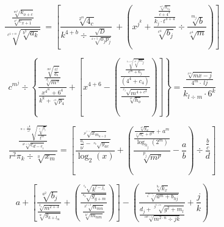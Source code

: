 \documentclass[aspectratio=169]{beamer}
\begin{document}

\begin{frame}
\fontsize{60pt}{60pt}

$$ \frac{\frac{\sqrt[m^4]{k_{o+c}}}{\sqrt[x^c]{c_{x+1}}}}{\sqrt[c^{1+n}]{\sqrt[b^3]{a_k}}}\ = \left[\frac{\sqrt[2^m]{4_c}}{k^{4+b}\div\frac{\sqrt{D}}{\sqrt[4+5]{o_jp_j}}}\ + \left(x^{j^k}+\frac{\frac{\frac{\sqrt[m^n]{h_{c_d}}}{c+4^3}}{k_j \cdot t^{3+4}}}{\sqrt[c^4]{b_j}}\div\frac{\sqrt[m_j]{b}}{\sqrt[c^4]{m}}\right)\right] $$

\end{frame}


\begin{frame}
\fontsize{60pt}{60pt}

$${c^{m^j}}\div{\left\{\frac{\frac{\sqrt[m^4]{\frac{c^j}{d_h}}}{\sqrt[d_j]{m^n}}}{\frac{x^{4^m}+6^4}{k^k+\sqrt[c^4]{p_4}}}+\left[x^{4+6}-\left(\frac{\frac{\frac{\sqrt[4+c]{\sqrt[c^j]{m_j}}}{c^m+6_j}}{\left(4^4+c_4\right)}}{\frac{\sqrt[x_j \ \  \ \ \ ]{m^{4+c^2}}}{\sqrt[c^4]{h_o}}}\right)\right]\right\}}=\frac{\frac{\sqrt[x^m]{mx-j}}{4^m\cdot \:lj}}{k_{l\div m}\cdot 6^k}$$

\end{frame}


\begin{frame}
\fontsize{60pt}{60pt}

$$\frac{\frac{\sqrt[n+\frac{\sqrt[n]{4}}{m^4} \ \  \ \ \ ]{\frac{\sqrt[z]{^{g_j}}}{t^m}}}{\sqrt[a^{b+1}]{c_{d-e_i}}}}{r^2\pi _k\div \sqrt[\pi ]{x_m}}=\left[\frac{\frac{\sqrt[p^{j^{i+1}}]{x_{m_{n\div 2}}}}{\frac{a_i}{b^j}-\sqrt[x_k \ \  \ \ \ ]{y_{ac}}}}{\log _2\left(x\right)}+\left(\frac{\frac{\frac{\sqrt[x^p]{y_w}}{\sqrt[f]{a_c}+b^m}+a^m}{\log _{h_j}\left(2^m\right)}}{\sqrt[p_j]{m^p}}-\frac{a}{b}\right)\div \frac{\frac{b}{c}}{d}\right]$$

\end{frame}


\begin{frame}
\fontsize{60pt}{60pt}

$$a+\left[ \frac{\sqrt[a^2]{b_j}}{\frac{\sqrt[b_x]{m^{2+3}}}{\sqrt[w]{g_{k+l_m}}}} + \left( \frac{\frac{\sqrt[c_k \ \ \ \ \ ]{k^{l-j_i}}}{\sqrt[n_k \ \  \ \ \ ]{g_{g+m}}}}{\frac{\sqrt[h^{x+2}]{n_{mn}}}{\sqrt[k^t]{m_{nm}}}} \right) \right] - \left( \frac{\frac{\sqrt[h_l]{k_x}}{\sqrt[s^{k-l_j}]{a^m+b_{hj}}}}{\frac{d_j+ \sqrt[g^{h+m}]{g^2+m_l}}{\sqrt[m^{k\div j}]{m^{2\cdot n}\div jk}}} + \frac{j}{k} \right) $$

\end{frame}
\end{document}
